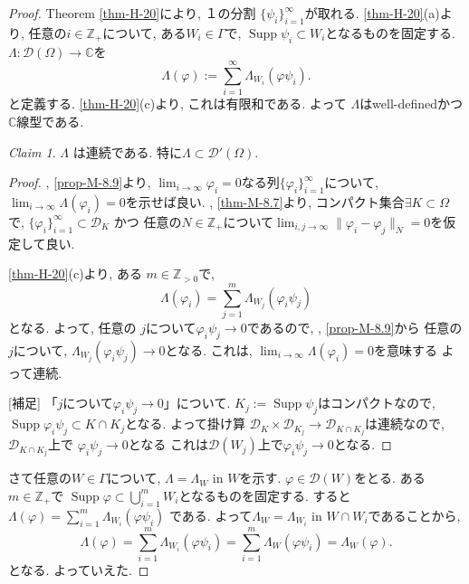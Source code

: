 \documentclass[dvipdfmx,a4paper,11pt]{article} %
\theoremstyle{definition}
\theoremstyle{remark}
\newtheorem{claim}[thm]{Claim}
\numberwithin{equation}{section}
\newcommand{\N}{\mathbb{Z}_+}
\begin{document}
\begin{proof}
Theorem \ref{thm-H-20}により, １の分割
\(\{\psi_i\}_{i=1}^\infty\)が取れる.   
\ref{thm-H-20}(a)より, 任意の\(i \in \N\)について, ある\(W_i \in \Gamma\)で, \(\operatorname{Supp}\psi_i \subset W_i\)となるものを固定する. 
 \(\Lambda: \mathcal{D}(\Omega) \to \mathbb{C}\)を
\[
\Lambda(\varphi) := \sum_{i=1}^\infty \Lambda_{W_i}(\varphi \psi_i).
\]
と定義する. \ref{thm-H-20}(c)より, これは有限和である. 
よって \(\Lambda\)はwell-definedかつ\(\mathbb{C}\)線型である.

\begin{tcolorbox}[mybox]
\begin{claim}
\(\Lambda\) は連続である. 特に\(\Lambda \subset \mathcal{D}'(\Omega)\).  
\end{claim}
\end{tcolorbox}
\begin{proof}
\cite[Thm 6.6]{Rud}, \ref{prop-M-8.9}より,  $\lim_{i \to \infty} \varphi_i = 0$なる列\(\{\varphi_i\}_{i=1}^\infty\)について, 
$\lim_{i \to \infty} \Lambda(\varphi_i)=0$を示せば良い. 
\cite[Thm 6.5]{Rud}, \ref{thm-M-8.7}より, コンパクト集合\(\exists K \subset \Omega\)で,  \(\{\varphi_i\}_{i=1}^\infty \subset \mathcal{D}_K\) かつ 任意の$N \in \N$について\(\lim_{i,j \to \infty} \|\varphi_i - \varphi_j\|_N = 0\)を仮定して良い. 

\ref{thm-H-20}(c)より, ある \(m \in \mathbb{Z}_{>0}\)で, 
\[
\Lambda(\varphi_i) = \sum_{j=1}^m \Lambda_{W_j}(\varphi_i \psi_j) 
\]
となる. 
よって,  任意の $j$について\(\varphi_i \psi_j \to 0\)であるので, \cite[Thm 6.6]{Rud}, \ref{prop-M-8.9}から
任意の$j$について, \(\Lambda_{W_j}(\varphi_i \psi_j) \to 0\)となる. 
これは, \( \lim_{i \to \infty} \Lambda(\varphi_i) = 0\)を意味する よって連続.

[補足]
「$j$について\(\varphi_i \psi_j \to 0\)」について. 
\(K_j := \operatorname{Supp} \psi_j\)はコンパクトなので, 
\(\operatorname{Supp} \varphi_i \psi_j \subset K \cap K_j\)となる. 
よって掛け算
\(\mathcal{D}_K \times \mathcal{D}_{K_j} \to \mathcal{D}_{K \cap K_j} \)は連続なので,   
$\mathcal{D}_{K \cap K_j}$上で
\(\varphi_i \psi_j \to 0 \)となる
これは$\mathcal{D}(W_j)$上で\( \varphi_i \psi_j \to 0 \)となる. 
\end{proof}


さて任意の$W \in \Gamma$について, 
 \(\Lambda = \Lambda_W \text{ in } W \)を示す.   
\(\varphi \in \mathcal{D}(W)\)をとる. ある\(m \in \N\)で
\(\operatorname{Supp}\varphi \subset \bigcup_{i=1}^m W_i\)となるものを固定する. 
すると  
\(\Lambda(\varphi) = \sum_{i=1}^m \Lambda_{W_i}(\varphi \psi_i)\)
である. よって$\Lambda_W = \Lambda_{W_i} \text{ in } W \cap W_i $であることから, 
\[
\Lambda (\varphi)
= \sum_{i=1}^m \Lambda_{W_i}(\varphi \psi_i)
= \sum_{i=1}^m \Lambda_{W}(\varphi \psi_i)
 = \Lambda_W(\varphi).
\]
となる. よっていえた.


\end{proof}
\end{document}
